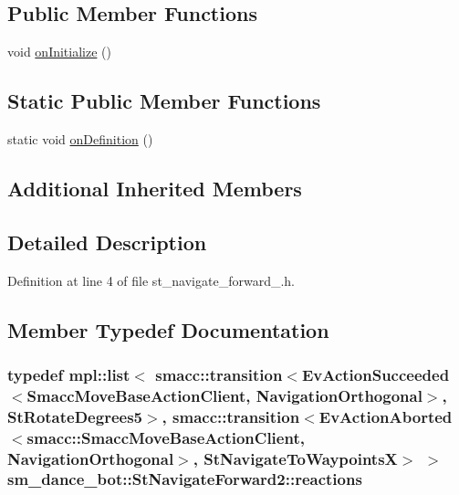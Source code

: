 \subsection*{Public Member Functions}
\begin{DoxyCompactItemize}
\item 
void \hyperlink{structsm__dance__bot_1_1StNavigateForward2_a94ba42076162a9276a6654b057b7c36d}{on\+Initialize} ()
\end{DoxyCompactItemize}
\subsection*{Static Public Member Functions}
\begin{DoxyCompactItemize}
\item 
static void \hyperlink{structsm__dance__bot_1_1StNavigateForward2_acf2394745adca290c9e3a8ff03a8618d}{on\+Definition} ()
\end{DoxyCompactItemize}
\subsection*{Additional Inherited Members}


\subsection{Detailed Description}


Definition at line 4 of file st\+\_\+navigate\+\_\+forward\+\_.\+h.



\subsection{Member Typedef Documentation}
\subsubsection[{\texorpdfstring{reactions}{reactions}}]{\setlength{\rightskip}{0pt plus 5cm}typedef mpl\+::list$<$ {\bf smacc\+::transition}$<$Ev\+Action\+Succeeded$<$Smacc\+Move\+Base\+Action\+Client, {\bf Navigation\+Orthogonal}$>$, {\bf St\+Rotate\+Degrees5}$>$, {\bf smacc\+::transition}$<$Ev\+Action\+Aborted$<${\bf smacc\+::\+Smacc\+Move\+Base\+Action\+Client}, {\bf Navigation\+Orthogonal}$>$, {\bf St\+Navigate\+To\+WaypointsX}$>$ $>$ {\bf sm\+\_\+dance\+\_\+bot\+::\+St\+Navigate\+Forward2\+::reactions}}\hypertarget{structsm__dance__bot_1_1StNavigateForward2_ac122ffa9560f45a74b978d912ef2c3ed}{}\label{structsm__dance__bot_1_1StNavigateForward2_ac122ffa9560f45a74b978d912ef2c3ed}


